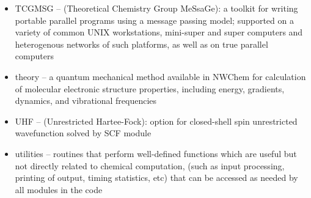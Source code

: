 \begin{itemize}
\item TCGMSG -- (Theoretical Chemistry Group MeSsaGe): a toolkit for 
writing portable parallel 
programs using a message passing model; supported on a variety of common
UNIX workstations, mini-super and super computers and heterogenous
networks of such platforms, as well as on true parallel computers

\item theory -- a quantum mechanical method available in NWChem for
calculation
of molecular electronic structure properties, including energy, gradients,
dynamics, and vibrational frequencies

\item UHF -- (Unrestricted Hartee-Fock): option for closed-shell
spin unrestricted wavefunction
solved by SCF module

\item utilities -- routines that perform well-defined functions which are
useful but not directly related to chemical computation, (such as input
processing, printing of output, timing statistics, etc) that can be  
accessed as needed by all modules in the code 



\end{itemize}

